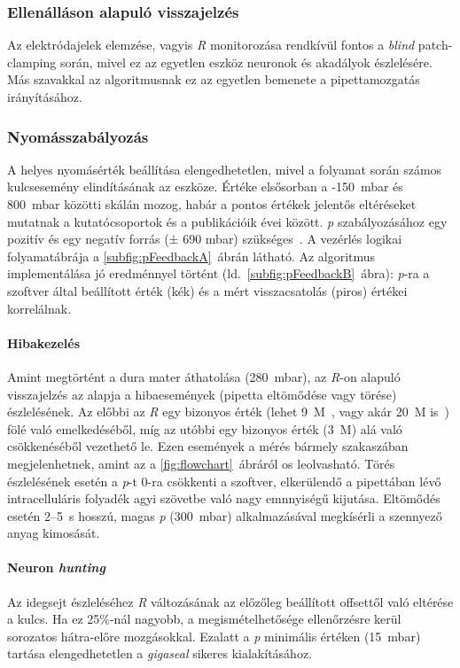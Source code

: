 \documentclass[12pt,a4paper]{report}
\begin{document}
\subsubsection*{Ellenálláson alapuló visszajelzés}
Az elektródajelek elemzése, vagyis \textit{R} monitorozása rendkívül fontos a \textit{blind} patch-clamping során, mivel ez az egyetlen eszköz neuronok és akadályok észlelésére. Más szavakkal az algoritmusnak ez az egyetlen bemenete a pipettamozgatás irányításához.\par

\subsubsection*{Nyomásszabályozás}
A helyes nyomásérték beállítása elengedhetetlen, mivel a folyamat során számos kulcsesemény elindításának az eszköze. Értéke elsősorban a -150~mbar és 800~mbar közötti skálán mozog, habár a pontos értékek jelentős eltéréseket mutatnak a kutatócsoportok és a publikációik évei között. \textit{p} szabályozásához egy pozitív és egy negatív forrás (± 690 mbar) szükséges~\cite{desai2015}. A vezérlés logikai folyamatábrája a \ref{subfig:pFeedbackA}~ábrán látható. Az algoritmus implementálása jó eredménnyel történt (ld.\ \ref{subfig:pFeedbackB}~ábra): \textit{p}-ra a szoftver által beállított érték (kék) és a mért visszacsatolás (piros) értékei korrelálnak.

\paragraph*{Hibakezelés}
Amint megtörtént a dura mater áthatolása (280~mbar), az \textit{R}-on alapuló visszajelzés az alapja a hibaesemények (pipetta eltömődése vagy törése) észlelésének. Az előbbi az \textit{R} egy bizonyos érték (lehet 9~M\textOmega{}~\cite{desai2015}, vagy akár 20~M\textOmega{} is~\cite{li2017}) fölé való emelkedéséből, míg az utóbbi egy bizonyos érték (3~M\textOmega) alá való csökkenéséből vezethető le. Ezen események a mérés bármely szakaszában megjelenhetnek, amint az a \ref{fig:flowchart}~ábráról os leolvasható. Törés észlelésének esetén a \textit{p}-t 0-ra csökkenti a szoftver, elkerülendő a pipettában lévő intracelluláris folyadék agyi szövetbe való nagy emnnyiségű kijutása. Eltömődés esetén 2--5~s hosszú, magas \textit{p} (300~mbar) alkalmazásával megkísérli a szennyező anyag kimosását.

\paragraph*{Neuron \textit{hunting}}
Az idegsejt észleléséhez \textit{R} változásának az előzőleg beállított offsettől való eltérése a kulcs. Ha ez 25\%-nál nagyobb, a megismételhetősége ellenőrzésre kerül sorozatos hátra-előre mozgásokkal. Ezalatt a \textit{p} minimális értéken (15~mbar) tartása elengedhetetlen a \textit{gigaseal} sikeres kialakításához. 
\end{document}
